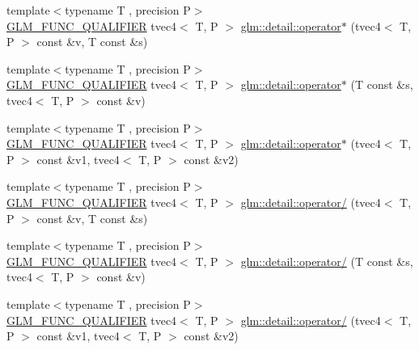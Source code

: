 \begin{DoxyCompactItemize}
\item 
{\footnotesize template$<$typename T , precision P$>$ }\\\hyperlink{setup_8hpp_a33fdea6f91c5f834105f7415e2a64407}{G\+L\+M\+\_\+\+F\+U\+N\+C\+\_\+\+Q\+U\+A\+L\+I\+F\+I\+ER} tvec4$<$ T, P $>$ \hyperlink{namespaceglm_1_1detail_a2b8123f6026f50767dd4c3a6d47d7dcf}{glm\+::detail\+::operator$\ast$} (tvec4$<$ T, P $>$ const \&v, T const \&s)
\item 
{\footnotesize template$<$typename T , precision P$>$ }\\\hyperlink{setup_8hpp_a33fdea6f91c5f834105f7415e2a64407}{G\+L\+M\+\_\+\+F\+U\+N\+C\+\_\+\+Q\+U\+A\+L\+I\+F\+I\+ER} tvec4$<$ T, P $>$ \hyperlink{namespaceglm_1_1detail_ad43a1a115f4dd2d53fe175857fe6363b}{glm\+::detail\+::operator$\ast$} (T const \&s, tvec4$<$ T, P $>$ const \&v)
\item 
{\footnotesize template$<$typename T , precision P$>$ }\\\hyperlink{setup_8hpp_a33fdea6f91c5f834105f7415e2a64407}{G\+L\+M\+\_\+\+F\+U\+N\+C\+\_\+\+Q\+U\+A\+L\+I\+F\+I\+ER} tvec4$<$ T, P $>$ \hyperlink{namespaceglm_1_1detail_a354635a990128ffd8d8de52cdca11cd9}{glm\+::detail\+::operator$\ast$} (tvec4$<$ T, P $>$ const \&v1, tvec4$<$ T, P $>$ const \&v2)
\item 
{\footnotesize template$<$typename T , precision P$>$ }\\\hyperlink{setup_8hpp_a33fdea6f91c5f834105f7415e2a64407}{G\+L\+M\+\_\+\+F\+U\+N\+C\+\_\+\+Q\+U\+A\+L\+I\+F\+I\+ER} tvec4$<$ T, P $>$ \hyperlink{namespaceglm_1_1detail_adc8b302b584d8e7b840c80b35dc4ce5a}{glm\+::detail\+::operator/} (tvec4$<$ T, P $>$ const \&v, T const \&s)
\item 
{\footnotesize template$<$typename T , precision P$>$ }\\\hyperlink{setup_8hpp_a33fdea6f91c5f834105f7415e2a64407}{G\+L\+M\+\_\+\+F\+U\+N\+C\+\_\+\+Q\+U\+A\+L\+I\+F\+I\+ER} tvec4$<$ T, P $>$ \hyperlink{namespaceglm_1_1detail_a067ebd47461778decae2fb8b47e11ad3}{glm\+::detail\+::operator/} (T const \&s, tvec4$<$ T, P $>$ const \&v)
\item 
{\footnotesize template$<$typename T , precision P$>$ }\\\hyperlink{setup_8hpp_a33fdea6f91c5f834105f7415e2a64407}{G\+L\+M\+\_\+\+F\+U\+N\+C\+\_\+\+Q\+U\+A\+L\+I\+F\+I\+ER} tvec4$<$ T, P $>$ \hyperlink{namespaceglm_1_1detail_a1cd62b3be865c2dd9028d05cb5bb0696}{glm\+::detail\+::operator/} (tvec4$<$ T, P $>$ const \&v1, tvec4$<$ T, P $>$ const \&v2)
\item 

\end{DoxyCompactItemize}
